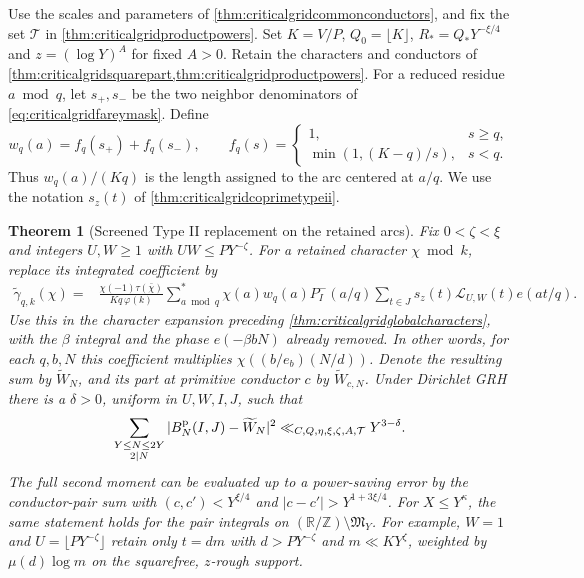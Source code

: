 \documentclass[11pt,a4paper]{article}
\numberwithin{equation}{section}
\newtheorem{theorem}{Theorem}[section]
\begin{document}
Use the scales and parameters of \cref{thm:criticalgridcommonconductors},
and fix the set $\mathcal T$ in \cref{thm:criticalgridproductpowers}.
Set $K=V/P$, $Q_0=\lfloor K\rfloor$, $R_*=Q_*Y^{-\xi/4}$ and
$z=(\log Y)^A$ for fixed $A>0$. Retain the characters and
conductors of \cref{thm:criticalgridsquarepart,thm:criticalgridproductpowers}.
For a reduced residue $a\bmod q$, let $s_+,s_-$ be the two
neighbor denominators of \cref{eq:criticalgridfareymask}.
Define
\begin{equation}
 w_q(a)=f_q(s_+)+f_q(s_-),\qquad
 f_q(s)=
 \begin{cases}
  1,&s\ge q,\\
  \min(1,(K-q)/s),&s<q .
 \end{cases}
 \label{eq:criticalgridarclengthweight}
\end{equation}
Thus $w_q(a)/(Kq)$ is the length assigned to the arc
centered at $a/q$. We use the notation $s_z(t)$ of
\cref{thm:criticalgridcoprimetypeii}.

\begin{theorem}[Screened Type II replacement on the retained arcs]
\label{thm:criticalgridfrozenvaughan}
Fix $0<\zeta<\xi$ and integers $U,W\ge1$ with
$UW\le P Y^{-\zeta}$. For a retained character $\chi\bmod k$,
replace its integrated coefficient by
\begin{align}
 \widetilde\gamma_{q,k}(\chi)
  ={}&\frac{\chi(-1)\tau(\bar\chi)}{Kq\,\varphi(k)}
    \sum_{a\bmod q}^* \chi(a) w_q(a) P_I^-(a/q)
      \sum_{t\in J}s_z(t)\mathcal L_{U,W}(t)e(at/q).
 \label{eq:criticalgridfrozenvaughancoeff}
\end{align}
Use this in the character expansion preceding
\cref{thm:criticalgridglobalcharacters}, with the
$\beta$ integral and the phase $e(-\beta bN)$ already removed.
In other words, for each $q,b,N$ this coefficient multiplies
$\chi((b/e_b)(N/d))$. Denote the resulting sum by
$\widetilde W_N$, and its part at primitive conductor $c$
by $\widetilde W_{c,N}$.
Under Dirichlet GRH there is a $\delta>0$, uniform in
$U,W,I,J$, such that
\begin{equation}
 \sum_{\substack{Y\le N\le2Y\\2\mid N}}
            |B_N^{\rm p}(I,J)-\widetilde W_N|^2
      \ll_{C,Q,\eta,\xi,\zeta,A,\mathcal T}Y^{3-\delta}.
 \label{eq:criticalgridfrozenvaughanerror}
\end{equation}
The full second moment can be evaluated up to a power-saving
error by the conductor-pair sum with
$(c,c')<Y^{\xi/4}$ and $|c-c'|>Y^{1+3\xi/4}$.
For $X\le Y^\kappa$, the same statement holds for the pair
integrals on $(\mathbb R/\mathbb Z)\setminus\mathfrak M_Y$.
For example, $W=1$ and $U=\lfloor P Y^{-\zeta}\rfloor$ retain
only $t=dm$ with $d>P Y^{-\zeta}$ and $m\ll K Y^\zeta$,
weighted by $\mu(d)\log m$ on the squarefree, $z$-rough support.
\end{theorem}
\end{document}
